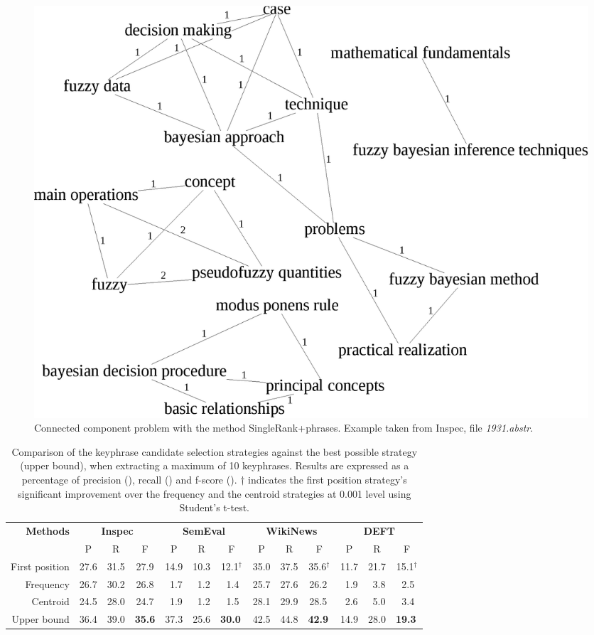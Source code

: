   \begin{figure}[h]
    \centering
    \includegraphics[width=.475\textwidth]{include/1931.eps}
    \caption{Connected component problem with the method SingleRank+phrases.
             Example taken from Inspec, file \textit{1931.abstr}.
             \label{fig:phrases_graph}}
  \end{figure}

  \begin{table}
    \centering
    \begin{tabular}{@{ }rcccccccccccc@{ }}
      \toprule
      \multirow{2}{*}[-2pt]{\textbf{Methods}} & \multicolumn{3}{c}{\textbf{Inspec}} & \multicolumn{3}{c}{\textbf{SemEval}} & \multicolumn{3}{c}{\textbf{WikiNews}} & \multicolumn{3}{c}{\textbf{DEFT}}\\
      \cmidrule(lr){2-4}\cmidrule(lr){5-7}\cmidrule(lr){8-10}\cmidrule(l){11-13}
      & P & R & F & P & R & F & P & R & F & P & R & F\\
      \midrule
      First position & 27.6 & 31.5 & 27.9  & 14.9 & 10.3 & 12.1$^\dagger$ & 35.0 & 37.5 & 35.6$^\dagger$ & 11.7 & 21.7 & 15.1$^\dagger$\\
      Frequency & 26.7 & 30.2 & 26.8 & $~~$1.7 & $~~$1.2 & $~~$1.4$^{~}$ & 25.7 & 27.6 & 26.2$^{~}$ & $~~$1.9 & $~~$3.8 & $~~$2.5$^{~}$\\
      Centroid & 24.5 & 28.0 & 24.7 & $~~$1.9 & $~~$1.2 & $~~$1.5$^{~}$ & 28.1 & 29.9 & 28.5$^{~}$ & $~~$2.6 & $~~$5.0 & $~~$3.4$^{~}$\\
      \midrule
      Upper bound & 36.4 & 39.0 & \textbf{35.6} & 37.3 & 25.6 & \textbf{30.0}$^{~}$ & 42.5 & 44.8 & \textbf{42.9}$^{~}$ & 14.9 & 28.0 & \textbf{19.3}$^{~}$\\
      \bottomrule
    \end{tabular}
    \caption{Comparison of the keyphrase candidate selection strategies against
             the best possible strategy (upper bound), when extracting a maximum
             of 10 keyphrases. Results are expressed as a percentage of
             precision (), recall () and f-score ().
             $\dagger$ indicates the first position strategy's significant
             improvement over the frequency and the centroid strategies at 0.001
             level using Student's t-test.
             \label{tab:cluster_ranking_evaluation}}
  \end{table}
  
